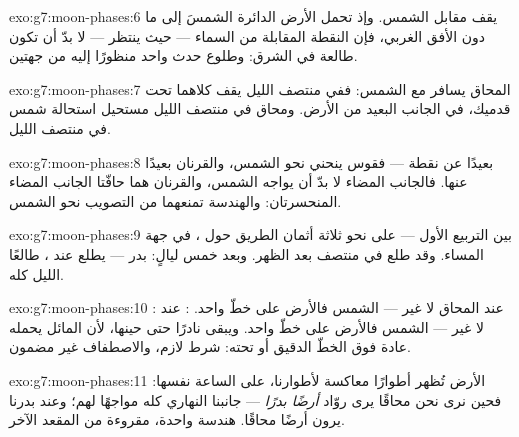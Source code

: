 \begin{solution}{exo:g7:moon-phases:6}
 يقف مقابل الشمس. وإذ تحمل الأرض الدائرة الشمسَ إلى ما دون
الأفق الغربي، فإن النقطة المقابلة من السماء --- حيث ينتظر
 --- لا بدّ أن تكون طالعة في الشرق:  وطلوع 
حدث واحد منظورًا إليه من جهتين.
\end{solution}

\begin{solution}{exo:g7:moon-phases:7}
المحاق يسافر مع الشمس: ففي منتصف الليل يقف كلاهما تحت قدميك، في
الجانب البعيد من الأرض. ومحاق في منتصف الليل مستحيل استحالة شمس
في منتصف الليل.
\end{solution}

\begin{solution}{exo:g7:moon-phases:8}
بعيدًا عن نقطة  --- فقوس  ينحني نحو الشمس، والقرنان
بعيدًا عنها. فالجانب المضاء لا بدّ أن يواجه الشمس، والقرنان هما
حافّتا الجانب المضاء المنحسرتان: والهندسة تمنعهما من التصويب
نحو الشمس.
\end{solution}

\begin{solution}{exo:g7:moon-phases:9}
بين التربيع الأول  --- على نحو ثلاثة أثمان الطريق حول
، في جهة المساء. وقد طلع في منتصف بعد الظهر. وبعد خمس
ليالٍ: بدر --- يطلع عند ، طالعًا الليل كله.
\end{solution}

\begin{solution}{exo:g7:moon-phases:10}
: عند المحاق لا غير --- الشمس  فالأرض على خطّ واحد.
: عند  لا غير --- الشمس فالأرض  على خطّ واحد.
ويبقى نادرًا حتى حينها، لأن   المائل يحمله عادة فوق
الخطّ الدقيق أو تحته:  شرط لازم، والاصطفاف غير مضمون.
\end{solution}

\begin{solution}{exo:g7:moon-phases:11}
الأرض تُظهر أطوارًا معاكسة لأطوارنا، على الساعة نفسها: فحين نرى
نحن محاقًا يرى روّاد  \emph{أرضًا بدرًا} --- جانبنا النهاري
كله مواجهًا لهم؛ وعند بدرنا يرون أرضًا محاقًا. هندسة واحدة،
مقروءة من المقعد الآخر.
\end{solution}

